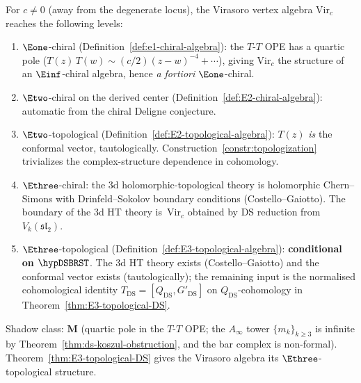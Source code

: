\begin{remark}
\label{rem:virasoro-EN-level}
For $c \ne 0$ (away from the degenerate locus), the
Virasoro vertex algebra $\mathrm{Vir}_c$ reaches the
following levels:
\begin{enumerate}[label=\textup{(\roman*)}]
\item $\Eone$-chiral
 (Definition~\ref{def:e1-chiral-algebra}): the $T$-$T$
 OPE has a quartic pole
 ($T(z)\,T(w) \sim (c/2)(z-w)^{-4} + \cdots$), giving
 $\mathrm{Vir}_c$ the structure of an $\Einf$-chiral
 algebra, hence \emph{a fortiori} $\Eone$-chiral.

\item $\Etwo$-chiral on the derived center
 (Definition~\ref{def:E2-chiral-algebra}): automatic from
 the chiral Deligne conjecture.

\item $\Etwo$-topological
 (Definition~\ref{def:E2-topological-algebra}):
 $T(z)$ \emph{is} the conformal vector, tautologically.
 Construction~\ref{constr:topologization} trivializes
 the complex-structure dependence in cohomology.

\item $\Ethree$-chiral: the 3d holomorphic-topological
 theory is holomorphic Chern--Simons with
 Drinfeld--Sokolov boundary conditions
 (Costello--Gaiotto). The boundary of the 3d HT theory
 is~$\mathrm{Vir}_c$ obtained by DS reduction from
 $V_k(\mathfrak{sl}_2)$.

\item $\Ethree$-topological
 (Definition~\ref{def:E3-topological-algebra}):
 \textbf{conditional on \(\hypDSBRST\)}. The 3d HT theory exists
 (Costello--Gaiotto) and the conformal vector exists
 (tautologically); the remaining input is the normalised
 cohomological identity
 $T_{\mathrm{DS}} = [Q_{\mathrm{DS}}, G'_{\mathrm{DS}}]$ on
 $Q_{\mathrm{DS}}$-cohomology in
 Theorem~\ref{thm:E3-topological-DS}.
\end{enumerate}
Shadow class: $\mathbf{M}$ (quartic pole in the $T$-$T$
OPE; the $A_\infty$ tower $\{m_k\}_{k \ge 3}$ is infinite
by Theorem~\ref{thm:ds-koszul-obstruction}, and the
bar complex is non-formal).
Theorem~\ref{thm:E3-topological-DS} gives the Virasoro algebra its
$\Ethree$-topological structure.
\end{remark}
